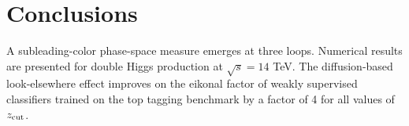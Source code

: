 \section{Conclusions}\label{sec:conclusions}

A subleading-color phase-space measure emerges at three loops. Numerical
results are presented for double Higgs production at $\sqrt{s} = 14$
TeV. The diffusion-based look-elsewhere effect improves on the eikonal
factor of weakly supervised classifiers trained on the top tagging
benchmark by a factor of 4 for all values of $z_{\rm cut}$.


